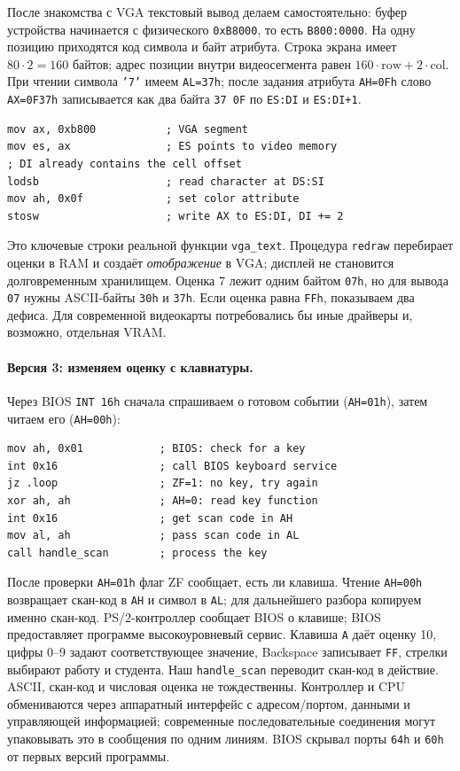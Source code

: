 После знакомства с VGA текстовый вывод делаем самостоятельно: буфер
устройства начинается с физического \texttt{0xB8000}, то есть \texttt{B800:0000}.
На одну позицию приходятся код символа и байт атрибута. Строка экрана имеет
$80\cdot2=160$ байтов; адрес позиции внутри видеосегмента равен
$160\cdot\text{row}+2\cdot\text{col}$.
При чтении символа \texttt{'7'} имеем \texttt{AL=37h}; после задания
атрибута \texttt{AH=0Fh} слово \texttt{AX=0F37h} записывается как два
байта \texttt{37 0F} по \texttt{ES:DI} и \texttt{ES:DI+1}.
\begin{lstlisting}[basicstyle=\ttfamily\small]
mov ax, 0xb800           ; VGA segment
mov es, ax               ; ES points to video memory
; DI already contains the cell offset
lodsb                    ; read character at DS:SI
mov ah, 0x0f             ; set color attribute
stosw                    ; write AX to ES:DI, DI += 2
\end{lstlisting}
Это ключевые строки реальной функции \texttt{vga\_text}.
Процедура \texttt{redraw} перебирает оценки в RAM и создаёт
\emph{отображение} в VGA; дисплей не становится долговременным хранилищем.
Оценка 7 лежит одним байтом \texttt{07h}, но для вывода \texttt{07}
нужны ASCII-байты \texttt{30h} и \texttt{37h}. Если оценка равна
\texttt{FFh}, показываем два дефиса.
Для современной видеокарты потребовались бы иные драйверы и, возможно,
отдельная VRAM.

\paragraph{Версия 3: изменяем оценку с клавиатуры.}
Через BIOS \texttt{INT 16h} сначала спрашиваем о готовом событии
(\texttt{AH=01h}), затем читаем его (\texttt{AH=00h}):
\begin{lstlisting}[basicstyle=\ttfamily\small]
mov ah, 0x01            ; BIOS: check for a key
int 0x16                ; call BIOS keyboard service
jz .loop                ; ZF=1: no key, try again
xor ah, ah              ; AH=0: read key function
int 0x16                ; get scan code in AH
mov al, ah              ; pass scan code in AL
call handle_scan        ; process the key
\end{lstlisting}
После проверки \texttt{AH=01h} флаг ZF сообщает, есть ли клавиша.
Чтение \texttt{AH=00h} возвращает скан-код в \texttt{AH} и символ
в \texttt{AL}; для дальнейшего разбора копируем именно скан-код.
PS/2-контроллер сообщает BIOS о клавише; BIOS предоставляет программе
высокоуровневый сервис. Клавиша \texttt{A} даёт оценку 10, цифры 0--9
задают соответствующее значение, Backspace записывает \texttt{FF},
стрелки выбирают работу и студента. Наш \texttt{handle\_scan} переводит
скан-код в действие. ASCII, скан-код и числовая оценка не тождественны.
Контроллер и CPU обмениваются через аппаратный интерфейс с адресом/портом,
данными и управляющей информацией; современные последовательные соединения
могут упаковывать это в сообщения по одним линиям. BIOS скрывал порты
\texttt{64h} и \texttt{60h} от первых версий программы.

